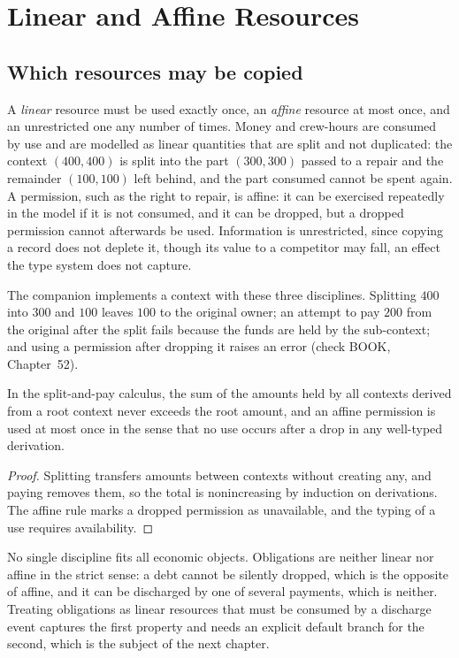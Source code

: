 \chapter{Linear and Affine Resources}\label{ch:52}

\section{Which resources may be copied}

A \emph{linear} resource must be used exactly once, an \emph{affine} resource at most once, and an unrestricted one any number of times. Money and crew-hours are consumed by use and are modelled as linear quantities that are split and not duplicated: the context $(400,400)$ is split into the part $(300,300)$ passed to a repair and the remainder $(100,100)$ left behind, and the part consumed cannot be spent again. A permission, such as the right to repair, is affine: it can be exercised repeatedly in the model if it is not consumed, and it can be dropped, but a dropped permission cannot afterwards be used. Information is unrestricted, since copying a record does not deplete it, though its value to a competitor may fall, an effect the type system does not capture.

The companion implements a context with these three disciplines. Splitting $400$ into $300$ and $100$ leaves $100$ to the original owner; an attempt to pay $200$ from the original after the split fails because the funds are held by the sub-context; and using a permission after dropping it raises an error (check BOOK, Chapter~52).

\begin{proposition}\label{prop:linear}
In the split-and-pay calculus, the sum of the amounts held by all contexts derived from a root context never exceeds the root amount, and an affine permission is used at most once in the sense that no use occurs after a drop in any well-typed derivation.
\end{proposition}

\begin{proof}
Splitting transfers amounts between contexts without creating any, and paying removes them, so the total is nonincreasing by induction on derivations. The affine rule marks a dropped permission as unavailable, and the typing of a use requires availability.
\end{proof}

No single discipline fits all economic objects. Obligations are neither linear nor affine in the strict sense: a debt cannot be silently dropped, which is the opposite of affine, and it can be discharged by one of several payments, which is neither. Treating obligations as linear resources that must be consumed by a discharge event captures the first property and needs an explicit default branch for the second, which is the subject of the next chapter.

